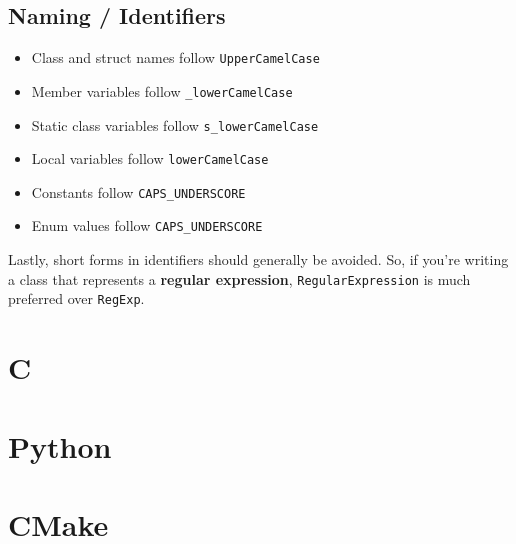 \documentclass[12pt]{article}
\begin{document}
\subsection{Naming / Identifiers}
\begin{itemize}
\item Class and struct names follow \texttt{UpperCamelCase}
\item Member variables follow \texttt{\_lowerCamelCase}
\item Static class variables follow \texttt{s\_lowerCamelCase}
\item Local variables follow \texttt{lowerCamelCase}
\item Constants follow \texttt{CAPS\_UNDERSCORE}
\item Enum values follow \texttt{CAPS\_UNDERSCORE}
\end{itemize}

Lastly, short forms in identifiers should generally be avoided. So, if you're writing a class that represents a \textbf{regular expression}, \texttt{RegularExpression} is much preferred over \texttt{RegExp}.

\section{C}

\section{Python}

\section{CMake}
\end{document}
